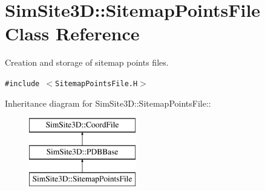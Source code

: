 \section{SimSite3D::Sitemap\-Points\-File Class Reference}
\label{classSimSite3D_1_1SitemapPointsFile}
Creation and storage of sitemap points files.  


{\tt \#include $<$Sitemap\-Points\-File.H$>$}

Inheritance diagram for SimSite3D::Sitemap\-Points\-File::\begin{figure}[H]
\begin{center}
\leavevmode
\includegraphics[height=3cm]{classSimSite3D_1_1SitemapPointsFile}
\end{center}
\end{figure}
